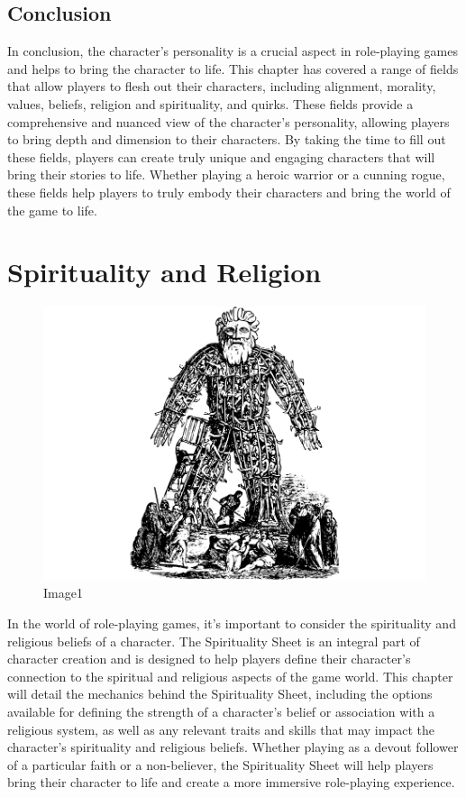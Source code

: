 \hypertarget{conclusion}{%
\subsection{Conclusion}\label{conclusion}}

In conclusion, the character's personality is a crucial aspect in
role-playing games and helps to bring the character to life. This
chapter has covered a range of fields that allow players to flesh out
their characters, including alignment, morality, values, beliefs,
religion and spirituality, and quirks. These fields provide a
comprehensive and nuanced view of the character's personality, allowing
players to bring depth and dimension to their characters. By taking the
time to fill out these fields, players can create truly unique and
engaging characters that will bring their stories to life. Whether
playing a heroic warrior or a cunning rogue, these fields help players
to truly embody their characters and bring the world of the game to
life.

\hypertarget{spirituality-and-religion}{%
\section{Spirituality and Religion}\label{spirituality-and-religion}}

\begin{figure}
\centering
\includegraphics{./images/religion01.pdf}
\caption{Image1}
\end{figure}

In the world of role-playing games, it's important to consider the
spirituality and religious beliefs of a character. The Spirituality
Sheet is an integral part of character creation and is designed to help
players define their character's connection to the spiritual and
religious aspects of the game world. This chapter will detail the
mechanics behind the Spirituality Sheet, including the options available
for defining the strength of a character's belief or association with a
religious system, as well as any relevant traits and skills that may
impact the character's spirituality and religious beliefs. Whether
playing as a devout follower of a particular faith or a non-believer,
the Spirituality Sheet will help players bring their character to life
and create a more immersive role-playing experience.

